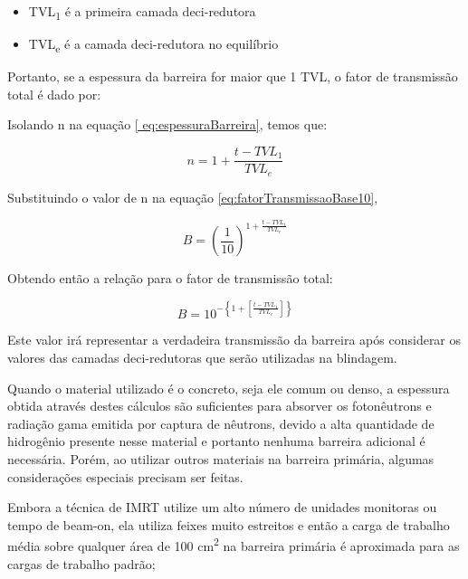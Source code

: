 \documentclass[11pt,a4paper]{article}
\begin{document}
            \begin{itemize}
                \item TVL\textsubscript{1} é a primeira camada deci-redutora
                \item TVL\textsubscript{e} é a camada deci-redutora no equilíbrio
            \end{itemize}

            Portanto, se a espessura da barreira for maior que 1 TVL, o fator de transmissão total é dado por:

            Isolando n na equação \ref{ eq:espessuraBarreira}, temos que:

            $$n = 1 + \frac{t - TVL_1}{TVL_e}$$

            Substituindo o valor de n na equação \ref{eq:fatorTransmissaoBase10},

            $$B = \left(\frac{1}{10}\right)^{1 + \frac{t - TVL_1}{TVL_e}}$$

            Obtendo então a relação para o fator de transmissão total:

            \begin{equation}
                B = 10^{-\left\{1 + \left[\frac{t - TVL_1}{TVL_e}\right]\right\}}
            \end{equation}

            Este valor irá representar a verdadeira transmissão da barreira após considerar os valores das camadas deci-redutoras que serão utilizadas na blindagem.

            
            Quando o material utilizado é o concreto, seja ele comum ou denso, a espessura obtida através destes cálculos são suficientes para absorver os fotonêutrons e radiação gama emitida por captura de nêutrons, devido a alta quantidade de hidrogênio presente nesse material e portanto nenhuma barreira adicional é necessária. Porém, ao utilizar outros materiais na barreira primária, algumas considerações especiais precisam ser feitas.

            Embora a técnica de IMRT utilize um alto número de unidades monitoras ou tempo de beam-on, ela utiliza feixes muito estreitos e então a carga de trabalho média sobre qualquer área de 100 cm\textsuperscript{2} na barreira primária é aproximada para as cargas de trabalho padrão;
\end{document}
